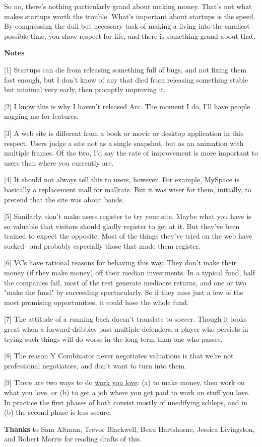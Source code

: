 So no, there's nothing particularly grand about making money.  That's
not what makes startups worth the trouble.  What's important about
startups is the speed.  By compressing the dull but necessary task
of making a living into the smallest possible time, you show respect
for life, and there is something grand about that.





\textbf{Notes}

[1]
Startups can die from releasing something full of bugs, and not
fixing them fast enough, but I don't know of any that died from
releasing something stable but minimal very early, then promptly
improving it.

[2]
I know this is why I haven't released Arc.  The moment I do,
I'll have people nagging me for features.

[3]
A web site is different from a book or movie or desktop application
in this respect.  Users judge a site not as a single snapshot, but
as an animation with multiple frames.  Of the two, I'd say the rate of
improvement is more important to users than where you currently
are.

[4]
It should not always tell this to users, however.  For example,
MySpace is basically a replacement mall for mallrats.  But it was
wiser for them, initially, to pretend that the site was about bands.

[5]
Similarly, don't make users register to try your site.  Maybe
what you have is so valuable that visitors should gladly register
to get at it.  But they've been trained to expect the opposite.
Most of the things they've tried on the web have sucked-- and
probably especially those that made them register.

[6]
VCs have rational reasons for behaving this way. They don't
make their money (if they make money) off their median investments.
In a typical fund, half the companies fail, most of the rest generate
mediocre returns, and one or two "make the fund" by succeeding
spectacularly.  So if they miss just a few of the most promising
opportunities, it could hose the whole fund.

[7]
The attitude of a running back doesn't translate to soccer.
Though it looks great when a forward dribbles past multiple defenders,
a player who persists in trying such things will do worse in the
long term than one who passes.

[8]
The reason Y Combinator never negotiates valuations
is that we're not professional negotiators, and don't want to turn
into them.

[9]
There are two ways to do 
\href{http://www.paulgraham.com/love.html}{work you love}: (a) to make money, then work
on what you love, or (b) to get a job where you get paid to work on
stuff you love.  In practice the first phases of both
consist mostly of unedifying schleps, and in (b) the second phase is less
secure.

\textbf{Thanks} to Sam Altman, Trevor Blackwell, Beau Hartshorne, Jessica 
Livingston, and Robert Morris for reading drafts of this.


